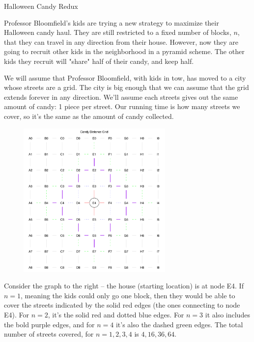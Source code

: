 \documentclass[10pt]{article}
\begin{document}
\thispagestyle{empty}
\handout

\begin{problem} Halloween Candy Redux \end{problem}

Professor Bloomfield's kids are trying a new strategy to maximize their Halloween candy haul.  They are still restricted to a fixed number of blocks, $n$, that they can travel in any direction from their house.  However, now they are going to recruit other kids in the neighborhood in a pyramid scheme.  The other kids they recruit will "share" half of their candy, and keep half.

We will assume that Professor Bloomfield, with kids in tow, has moved to a city whose streets are a grid.  The city is big enough that we can assume that the grid extends forever in any direction.  We'll assume each streets gives out the same amount of candy: 1 piece per street.  Our running time is how many streets we cover, so it's the same as the amount of candy collected.

\begin{figure}
\begin{center}
\includegraphics[width=3in]{ps4-graph.png}
\end{center}
\end{figure}

Consider the graph to the right -- the house (starting location) is at node E4.  If $n=1$, meaning the kids could only go one block, then they would be able to cover the streets indicated by the solid red edges (the ones connecting to node E4).  For $n=2$, it's the solid red and dotted blue edges.  For $n=3$ it also includes the bold purple edges, and for $n=4$ it's also the dashed green edges.  The total number of streets covered, for $n=1,2,3,4$ is $4,16,36,64$.
\end{document}
